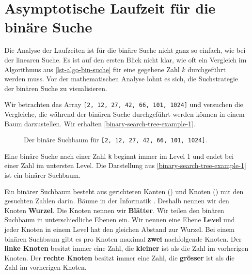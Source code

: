 \section{Asymptotische Laufzeit für die binäre Suche}

Die Analyse der Laufzeiten ist für die binäre Suche nicht ganz so einfach, wie bei der linearen Suche. Es ist auf den ersten Blick nicht klar, wie oft ein Vergleich im Algorithmus aus \autoref{lst-algo-bin-suche} für eine gegebene Zahl $k$ durchgeführt werden muss. Vor der mathematischen Analyse lohnt es sich, die Suchstrategie der binären Suche zu visualisieren.

\begin{example}
Wir betrachten das Array \lstinline[language=pseudocode]{[2, 12, 27, 42, 66, 101, 1024]} und versuchen die Vergleiche, die während der binären Suche durchgeführt werden können in einem Baum darzustellen. Wir erhalten \autoref{binary-search-tree-example-1}.

\begin{figure}[htb]
	\centering
{}
\caption{Der binäre Suchbaum für \lstinline{[2, 12, 27, 42, 66, 101, 1024]}.}
\label{binary-search-tree-example-1}
\end{figure}
\end{example}

Eine binäre Suche nach einer Zahl \lstinline[language=pseudocode]{k} beginnt immer im Level 1 und endet bei einer Zahl im untersten Level. Die Darstellung aus \autoref{binary-search-tree-example-1} ist ein binärer Suchbaum. 

\begin{definition}
Ein binärer Suchbaum besteht aus gerichteten Kanten () und Knoten () mit den gesuchten Zahlen darin. Bäume  in der Informatik . Deshalb nennen wir den  Knoten \textbf{Wurzel}. Die  Knoten nennen wir \textbf{Blätter}. Wir teilen den binären Suchbaum in unterschiedliche Ebenen ein. Wir nennen eine Ebene \textbf{Level} und jeder Knoten in einem Level hat den gleichen Abstand zur Wurzel. Bei einem binären Suchbaum gibt es pro Knoten maximal \textbf{zwei} nachfolgende Knoten. Der \textbf{linke Knoten} besitzt immer eine Zahl, die \textbf{kleiner} ist als die Zahl im vorherigen Knoten. Der \textbf{rechte Knoten} besitzt immer eine Zahl, die \textbf{grösser} ist als die Zahl im vorherigen Knoten.
\end{definition}

